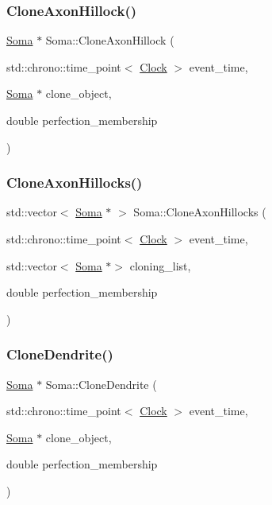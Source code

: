 \mbox{\label{classSoma_a31463fba2f535e9c7cb05c8622fe3562}} 
\subsubsection{\texorpdfstring{Clone\+Axon\+Hillock()}{CloneAxonHillock()}}
{\footnotesize\ttfamily \mbox{\hyperlink{classSoma}{Soma}} $\ast$ Soma\+::\+Clone\+Axon\+Hillock (\begin{DoxyParamCaption}\item[{std\+::chrono\+::time\+\_\+point$<$ \mbox{\hyperlink{universe_8h_a0ef8d951d1ca5ab3cfaf7ab4c7a6fd80}{Clock}} $>$}]{event\+\_\+time,  }\item[{\mbox{\hyperlink{classSoma}{Soma}} $\ast$}]{clone\+\_\+object,  }\item[{double}]{perfection\+\_\+membership }\end{DoxyParamCaption})}

\mbox{\label{classSoma_a299c95b89f50576244d1e56f531a80be}} 
\subsubsection{\texorpdfstring{Clone\+Axon\+Hillocks()}{CloneAxonHillocks()}}
{\footnotesize\ttfamily std\+::vector$<$ \mbox{\hyperlink{classSoma}{Soma}} $\ast$ $>$ Soma\+::\+Clone\+Axon\+Hillocks (\begin{DoxyParamCaption}\item[{std\+::chrono\+::time\+\_\+point$<$ \mbox{\hyperlink{universe_8h_a0ef8d951d1ca5ab3cfaf7ab4c7a6fd80}{Clock}} $>$}]{event\+\_\+time,  }\item[{std\+::vector$<$ \mbox{\hyperlink{classSoma}{Soma}} $\ast$$>$}]{cloning\+\_\+list,  }\item[{double}]{perfection\+\_\+membership }\end{DoxyParamCaption})}

\mbox{\label{classSoma_ad51c97b76dd7a1f77dc987ae33fd89bc}} 
\subsubsection{\texorpdfstring{Clone\+Dendrite()}{CloneDendrite()}}
{\footnotesize\ttfamily \mbox{\hyperlink{classSoma}{Soma}} $\ast$ Soma\+::\+Clone\+Dendrite (\begin{DoxyParamCaption}\item[{std\+::chrono\+::time\+\_\+point$<$ \mbox{\hyperlink{universe_8h_a0ef8d951d1ca5ab3cfaf7ab4c7a6fd80}{Clock}} $>$}]{event\+\_\+time,  }\item[{\mbox{\hyperlink{classSoma}{Soma}} $\ast$}]{clone\+\_\+object,  }\item[{double}]{perfection\+\_\+membership }\end{DoxyParamCaption})}

